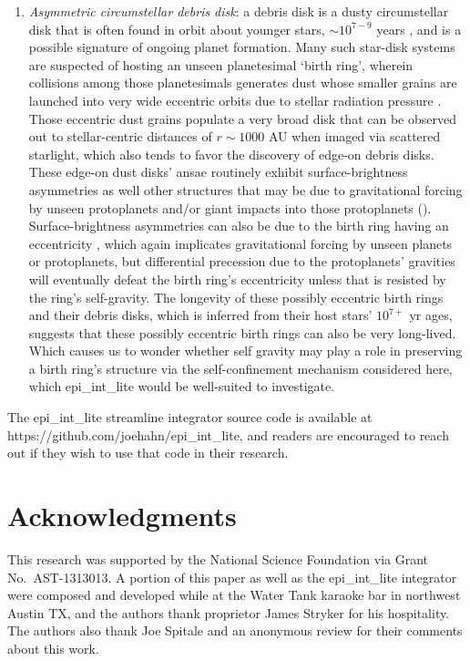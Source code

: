 \documentclass[preprint]{aastex62}
\begin{document}
\begin{enumerate}
\item {\it Asymmetric circumstellar debris disk}: a debris disk is a dusty circumstellar disk that 
is often found
in orbit about younger stars, $\sim10^{7-9}$ years \citep{Matthews18}, 
and is a possible signature of ongoing planet formation. Many such star-disk systems are suspected of hosting an unseen
planetesimal `birth ring', wherein collisions among those planetesimals generates dust whose smaller grains are 
launched into very wide eccentric orbits due to stellar radiation pressure \citep{SC06}.
Those eccentric dust grains populate a very broad disk that can be observed out to stellar-centric
distances of $r\sim1000$ AU when imaged via scattered starlight, which also tends to favor the discovery of 
edge-on debris disks. These edge-on dust disks' ansae
routinely exhibit surface-brightness asymmetries as well other structures that
may be due to gravitational forcing by unseen protoplanets and/or giant impacts into those protoplanets
(\citealt{Jetal23}). Surface-brightness asymmetries can also be due to the birth ring having an
eccentricity \citep{H09}, which again implicates gravitational forcing by unseen planets or protoplanets, but differential
precession due to the protoplanets' gravities will eventually defeat the birth ring's eccentricity
unless that is resisted by the ring's self-gravity. 
The longevity of these possibly eccentric birth rings and their debris disks, which is inferred from their 
host stars' $10^{7+}$ yr ages, suggests that these possibly eccentric
birth rings can also be very long-lived. Which causes us to wonder whether
self gravity may play a role in preserving a birth ring's structure
via the self-confinement mechanism considered here, which epi\_int\_lite would be well-suited to
investigate.

\end{enumerate}

The epi\_int\_lite streamline integrator source code is available at https://github.com/joehahn/epi\_int\_lite,
and readers are encouraged to reach out if they wish to use that code in their research.


\acknowledgments
\section{Acknowledgments}
\label{sec:Acknowledgments}

This research was supported by the National Science Foundation via Grant No.\ AST-1313013.
A portion of this paper as well as the epi\_int\_lite integrator
were composed and developed while at the Water Tank karaoke bar in northwest Austin TX, 
and the authors thank proprietor James Stryker for his hospitality.
The authors also thank Joe Spitale and an anonymous review for their comments about this work.
\end{document}
